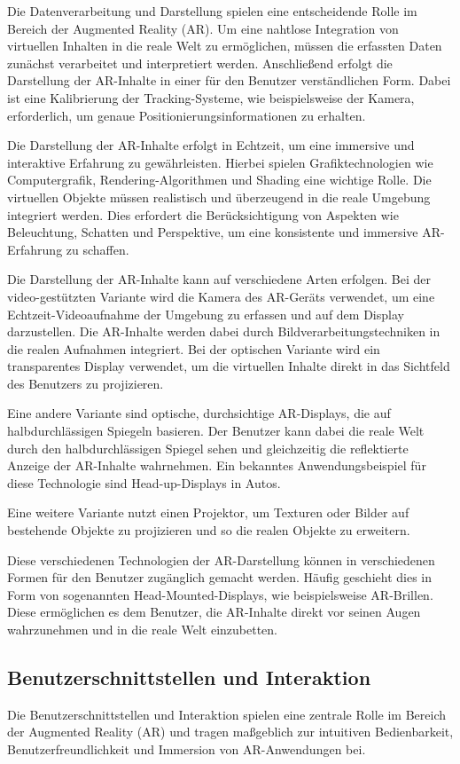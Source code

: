 Die Datenverarbeitung und Darstellung spielen eine entscheidende Rolle im
Bereich der Augmented Reality (AR). Um eine nahtlose Integration von virtuellen
Inhalten in die reale Welt zu ermöglichen, müssen die erfassten Daten zunächst
verarbeitet und interpretiert werden. Anschließend erfolgt die Darstellung der
AR-Inhalte in einer für den Benutzer verständlichen Form. Dabei ist eine
Kalibrierung der Tracking-Systeme, wie beispielsweise der Kamera, erforderlich,
um genaue Positionierungsinformationen zu erhalten.

Die Darstellung der AR-Inhalte erfolgt in Echtzeit, um eine immersive und
interaktive Erfahrung zu gewährleisten. Hierbei spielen Grafiktechnologien wie
Computergrafik, Rendering-Algorithmen und Shading eine wichtige Rolle. Die
virtuellen Objekte müssen realistisch und überzeugend in die reale Umgebung
integriert werden. Dies erfordert die Berücksichtigung von Aspekten wie
Beleuchtung, Schatten und Perspektive, um eine konsistente und immersive
AR-Erfahrung zu schaffen.

Die Darstellung der AR-Inhalte kann auf verschiedene Arten erfolgen. Bei der
video-gestützten Variante wird die Kamera des AR-Geräts verwendet, um eine
Echtzeit-Videoaufnahme der Umgebung zu erfassen und auf dem Display
darzustellen. Die AR-Inhalte werden dabei durch Bildverarbeitungstechniken in
die realen Aufnahmen integriert. Bei der optischen Variante wird ein
transparentes Display verwendet, um die virtuellen Inhalte direkt in das
Sichtfeld des Benutzers zu projizieren.

Eine andere Variante sind optische, durchsichtige AR-Displays, die auf
halbdurchlässigen Spiegeln basieren. Der Benutzer kann dabei die reale Welt
durch den halbdurchlässigen Spiegel sehen und gleichzeitig die reflektierte
Anzeige der AR-Inhalte wahrnehmen. Ein bekanntes Anwendungsbeispiel für diese
Technologie sind Head-up-Displays in Autos.

Eine weitere Variante nutzt einen Projektor, um Texturen oder Bilder auf
bestehende Objekte zu projizieren und so die realen Objekte zu erweitern.

Diese verschiedenen Technologien der AR-Darstellung können in verschiedenen
Formen für den Benutzer zugänglich gemacht werden. Häufig geschieht dies in
Form von sogenannten Head-Mounted-Displays, wie beispielsweise AR-Brillen.
Diese ermöglichen es dem Benutzer, die AR-Inhalte direkt vor seinen Augen
wahrzunehmen und in die reale Welt einzubetten.

\subsection{Benutzerschnittstellen und Interaktion}
Die Benutzerschnittstellen und Interaktion spielen eine zentrale Rolle im
Bereich der Augmented Reality (AR) und tragen maßgeblich zur intuitiven
Bedienbarkeit, Benutzerfreundlichkeit und Immersion von AR-Anwendungen bei.

